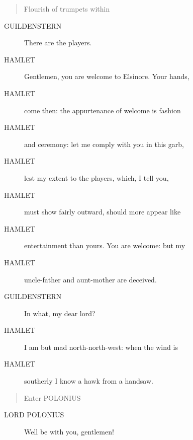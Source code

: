 \documentclass{article}
\begin{document}
\begin{quote}
Flourish of trumpets within
\end{quote}
          
\begin{description}
            
\item[GUILDENSTERN] There are the players.
\end{description}
          
\begin{description}
            
\item[HAMLET] Gentlemen, you are welcome to Elsinore. Your hands,
\item[HAMLET] come then: the appurtenance of welcome is fashion
\item[HAMLET] and ceremony: let me comply with you in this garb,
\item[HAMLET] lest my extent to the players, which, I tell you,
\item[HAMLET] must show fairly outward, should more appear like
\item[HAMLET] entertainment than yours. You are welcome: but my
\item[HAMLET] uncle-father and aunt-mother are deceived.
\end{description}
          
\begin{description}
            
\item[GUILDENSTERN] In what, my dear lord?
\end{description}
          
\begin{description}
            
\item[HAMLET] I am but mad north-north-west: when the wind is
\item[HAMLET] southerly I know a hawk from a handsaw.
\end{description}
          
\begin{quote}
Enter POLONIUS
\end{quote}
          
\begin{description}
            
\item[LORD POLONIUS] Well be with you, gentlemen!
\end{description}
          
\end{document}
